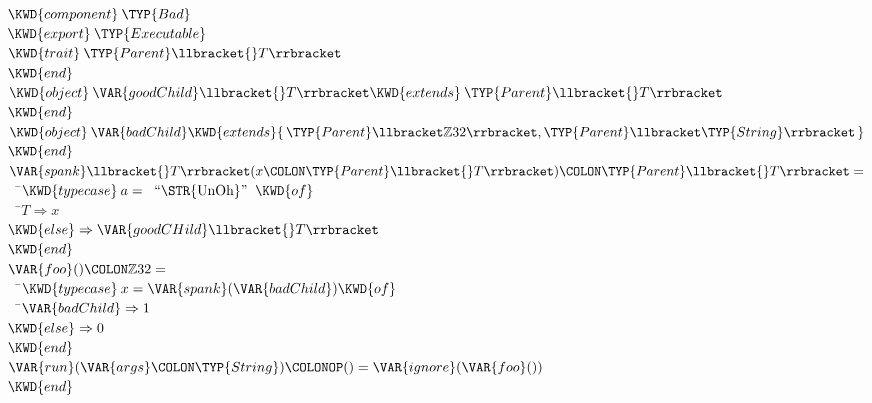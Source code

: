 \begin{Fortress}
\(\KWD{component}\:\TYP{Bad}\)\\
\(\KWD{export}\:\TYP{Executable}\)\\[4pt]
\(\KWD{trait}\:\TYP{Parent}\llbracket{}T\rrbracket\)\\
\(\KWD{end}\)\\[4pt]
\(\KWD{object}\:\VAR{goodChild}\llbracket{}T\rrbracket \KWD{extends}\:\TYP{Parent}\llbracket{}T\rrbracket\)\\
\(\KWD{end}\)\\[4pt]
\(\KWD{object}\:\VAR{badChild} \KWD{extends} \{\,\TYP{Parent}\llbracket\mathbb{Z}32\rrbracket, \TYP{Parent}\llbracket\TYP{String}\rrbracket\,\}\)\\
\(\KWD{end}\)\\[4pt]
\(\VAR{spank}\llbracket{}T\rrbracket(x\COLON \TYP{Parent}\llbracket{}T\rrbracket)\COLON \TYP{Parent}\llbracket{}T\rrbracket =\)\\
{\tt~~}\pushtabs\=\+\(  \KWD{typecase}\:a =\;\;\hbox{\rm``\STR{UnOh}''}\;\;\KWD{of}\)\\
{\tt~~}\pushtabs\=\+\(    T \Rightarrow x\)\\
\(    \KWD{else} \Rightarrow \VAR{goodCHild}\llbracket{}T\rrbracket\)\-\\\poptabs
\(  \KWD{end}\)\-\\[4pt]\poptabs
\(\VAR{foo}()\COLON \mathbb{Z}32 =\)\\
{\tt~~}\pushtabs\=\+\(  \KWD{typecase}\:x = \VAR{spank}(\VAR{badChild}) \KWD{of}\)\\
{\tt~~}\pushtabs\=\+\(    \VAR{badChild} \Rightarrow 1\)\\
\(    \KWD{else} \Rightarrow 0\)\-\\\poptabs
\(  \KWD{end}\)\-\\[4pt]\poptabs
\(\VAR{run}(\VAR{args}\COLON \TYP{String})\COLONOP() = \VAR{ignore}(\VAR{foo}())\)\\[4pt]
\(\KWD{end}\)
\end{Fortress}



